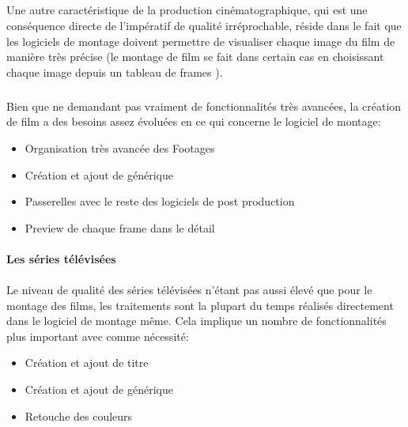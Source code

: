 \subparagraph{}

Une autre caractéristique de la production cinématographique, qui est
une conséquence directe de l'impératif de qualité irréprochable,
réside dans le fait que les logiciels de montage doivent permettre de
visualiser chaque image du film de manière très précise (le montage
de film se fait dans certain cas en choisissant chaque image depuis un
tableau de frames ).


\subparagraph{}

Bien que ne demandant pas vraiment de fonctionnalités très avancées,
la création de film a des besoins assez évoluées en ce qui concerne
le logiciel de montage:

\begin{itemize} \setlength{\itemsep}{2mm}

  \item{Organisation très avancée des Footages}

  \item{Création et ajout de générique}

  \item{Passerelles avec le reste des logiciels de post production}

  \item{Preview de chaque frame dans le détail}

\end{itemize}


\paragraph {Les séries télévisées}

\paragraph{}

Le niveau de qualité des séries télévisées n'étant pas aussi élevé
que pour le montage des films, les traitements sont la plupart du temps
réalisés directement dans le logiciel de montage même. Cela implique
un nombre de fonctionnalités plus important avec comme nécessité:

\begin{itemize} \setlength{\itemsep}{2mm}

  \item{Création et ajout de titre}

  \item{Création et ajout de générique}

  \item{Retouche des couleurs}

\end{itemize}

